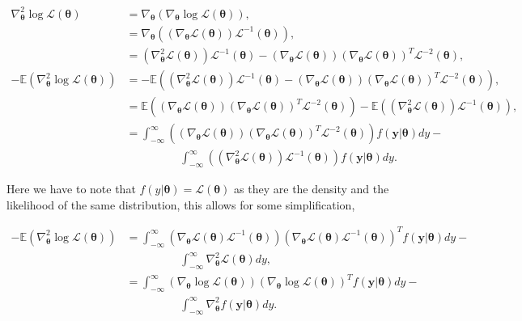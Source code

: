 \documentclass[honours,12pt]{unswthesis}
\newcommand{\E}{\mathbb{E}}
\newcommand{\ta}{\bm{\theta}}
\newcommand{\LL}{\log{\mathcal{L}}}
\newcommand{\y}{\mathbf{y}}
\numberwithin{equation}{section}
\begin{document}
\begin{align*}
	\nabla_{\ta}^{2} \LL (\ta) &= \nabla_{\ta} \left( \nabla_{\ta} \LL (\ta) \right),\\
	&= \nabla_{\ta} \left( \left( \nabla_{\ta} \mathcal{L} (\ta) \right) \mathcal{L}^{-1} (\ta) \right),\\
	&= \left( \nabla_{\ta}^{2} \mathcal{L} (\ta) \right) \mathcal{L}^{-1} (\ta) - \left( \nabla_{\ta} \mathcal{L} (\ta) \right) \left( \nabla_{\ta} \mathcal{L} (\ta) \right)^{T} \mathcal{L}^{-2} (\ta),\\
	-\E \left( \nabla_{\ta}^{2} \LL (\ta) \right) &= -\E \left( \left( \nabla_{\ta}^{2} \mathcal{L} (\ta) \right) \mathcal{L}^{-1} (\ta) - \left( \nabla_{\ta} \mathcal{L} (\ta) \right) \left( \nabla_{\ta} \mathcal{L} (\ta) \right)^{T} \mathcal{L}^{-2} (\ta) \right) ,\\
	&= \E \left( \left( \nabla_{\ta} \mathcal{L} (\ta) \right) \left( \nabla_{\ta} \mathcal{L} (\ta) \right)^{T} \mathcal{L}^{-2} (\ta) \right) - \E \left( \left( \nabla_{\ta}^{2} \mathcal{L} (\ta) \right) \mathcal{L}^{-1} (\ta) \right),\\
	&= \int_{-\infty}^{\infty} \left( \left( \nabla_{\ta} \mathcal{L} (\ta) \right) \left( \nabla_{\ta} \mathcal{L} (\ta) \right)^{T} \mathcal{L}^{-2} (\ta) \right)f(\y|\ta)dy -\\
	&\hspace{2cm} \int_{-\infty}^{\infty} \left( \left( \nabla_{\ta}^{2} \mathcal{L} (\ta) \right) \mathcal{L}^{-1} (\ta) \right)f(\y|\ta)dy.
\end{align*}

\noindent Here we have to note that $f(y|\ta) = \mathcal{L} (\ta)$ as they are the density and the likelihood of the same distribution, this allows for some simplification,

\begin{align*}
	-\E \left( \nabla_{\ta}^{2} \LL (\ta) \right) &= \int_{-\infty}^{\infty} \left( \nabla_{\ta} \mathcal{L} (\ta)\mathcal{L}^{-1} (\ta) \right) \left( \nabla_{\ta} \mathcal{L} (\ta) \mathcal{L}^{-1} (\ta)\right)^{T} f(\y|\ta)dy -\\
	&\hspace{2cm} \int_{-\infty}^{\infty}  \nabla_{\ta}^{2} \mathcal{L} (\ta)dy,\\
	&= \int_{-\infty}^{\infty} \left( \nabla_{\ta} \LL (\ta) \right) \left( \nabla_{\ta} \LL (\ta) \right)^{T}  f(\y|\ta)dy -\\
	&\hspace{2cm} \int_{-\infty}^{\infty} \nabla_{\ta}^{2} f(\y|\ta) dy.
\end{align*}
\end{document}
